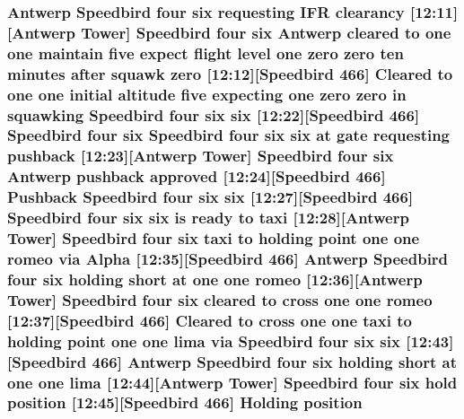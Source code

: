 \subsubsection[{\texorpdfstring{position}{position}}]{\setlength{\rightskip}{0pt plus 5cm}Antwerp Speedbird four {\bf six} requesting I\+FR clearancy \mbox{[}12\+:11\mbox{]}\mbox{[}Antwerp {\bf Tower}\mbox{]} Speedbird four {\bf six} Antwerp cleared to {\bf one} {\bf one} maintain five expect flight level {\bf one} {\bf zero} {\bf zero} {\bf ten} minutes after squawk {\bf zero} \mbox{[}12\+:12\mbox{]}\mbox{[}Speedbird 466\mbox{]} Cleared to {\bf one} {\bf one} initial altitude five expecting {\bf one} {\bf zero} {\bf zero} in {\bf squawking} Speedbird four {\bf six} {\bf six} \mbox{[}12\+:22\mbox{]}\mbox{[}Speedbird 466\mbox{]} Speedbird four {\bf six} Speedbird four {\bf six} {\bf six} at gate requesting pushback \mbox{[}12\+:23\mbox{]}\mbox{[}Antwerp {\bf Tower}\mbox{]} Speedbird four {\bf six} Antwerp pushback {\bf approved} \mbox{[}12\+:24\mbox{]}\mbox{[}Speedbird 466\mbox{]} Pushback Speedbird four {\bf six} {\bf six} \mbox{[}12\+:27\mbox{]}\mbox{[}Speedbird 466\mbox{]} Speedbird four {\bf six} {\bf six} is ready to taxi \mbox{[}12\+:28\mbox{]}\mbox{[}Antwerp {\bf Tower}\mbox{]} Speedbird four {\bf six} taxi to holding point {\bf one} {\bf one} {\bf romeo} via {\bf Alpha} \mbox{[}12\+:35\mbox{]}\mbox{[}Speedbird 466\mbox{]} Antwerp Speedbird four {\bf six} holding short at {\bf one} {\bf one} {\bf romeo} \mbox{[}12\+:36\mbox{]}\mbox{[}Antwerp {\bf Tower}\mbox{]} Speedbird four {\bf six} cleared to cross {\bf one} {\bf one} {\bf romeo} \mbox{[}12\+:37\mbox{]}\mbox{[}Speedbird 466\mbox{]} Cleared to cross {\bf one} {\bf one} taxi to holding point {\bf one} {\bf one} {\bf lima} via Speedbird four {\bf six} {\bf six} \mbox{[}12\+:43\mbox{]}\mbox{[}Speedbird 466\mbox{]} Antwerp Speedbird four {\bf six} holding short at {\bf one} {\bf one} {\bf lima} \mbox{[}12\+:44\mbox{]}\mbox{[}Antwerp {\bf Tower}\mbox{]} Speedbird four {\bf six} hold position \mbox{[}12\+:45\mbox{]}\mbox{[}Speedbird 466\mbox{]} Holding position}\hypertarget{happyDay4ExpectedATC_8txt_adfd9ba164d3d89874d56c97b672d9b6c}{}\label{happyDay4ExpectedATC_8txt_adfd9ba164d3d89874d56c97b672d9b6c}
